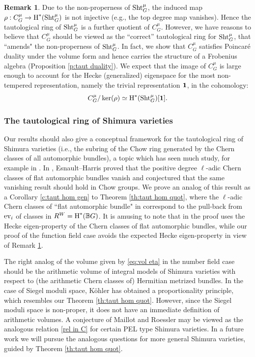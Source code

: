 \documentclass[reqno]{amsart}
\numberwithin{equation}{subsection}
\theoremstyle{definition}
\newtheorem{remark}[subsubsection]{Remark}
\def\BB{\mathbb{B}}
\newcommand\ev{\textup{ev}}
\newcommand\Sht{\textup{Sht}}
\newcommand{\cohog}[2]{\textup{H}^{#1}({#2})}     %
\begin{document}
\begin{remark}\label{rem hk=1}
Due to the non-properness of $\Sht^\mu_G$, the induced map $\rho:C^\mu_G  \to \cohog{*}{\Sht^\mu_G}$  is not injective (e.g., the top degree map vanishes). Hence the tautological ring of $\Sht^\mu_G$ is a further quotient of $C^\mu_G$. However, we have reasons to believe that $C^\mu_G$ should be viewed as the ``correct'' tautological ring for $\Sht^\mu_G$, that ``amends" the non-properness of $\Sht^\mu_G$. In fact, we show that $C^\mu_G$ satisfies Poincar\'e duality under the volume form and hence carries the structure of a Frobenius algebra (Proposition \ref{p:taut duality}).
We expect that the image of $C^\mu_G$ is large enough to account for the Hecke (generalized) eigenspace for the most non-tempered representation, namely the trivial representation ${\bf 1}$, in the cohomology:
$$
C^\mu_G /\ker(\rho) \simeq \cohog{*}{\Sht^\mu_G}[{\bf 1}].
$$
\end{remark}

\subsubsection{The tautological ring of Shimura varieties} Our results should also give a conceptual framework for the tautological ring of Shimura varieties (i.e., the subring of the Chow ring generated by the Chern classes of all automorphic bundles), a topic which has seen much study, for example in \cite{vdG,EH,WZ}. In \cite{EH}, Esnault--Harris proved that the positive degree $\ell$-adic Chern classes of flat automorphic bundles  vanish and conjectured that the same vanishing result should hold in Chow groups. We prove an analog of this result as a Corollary \ref{c:taut hom gen} to  Theorem \ref{th:taut hom quot}, where the $\ell$-adic Chern classes of ``flat automorphic bundle" in \cite{EH} correspond to the pull-back from $\ev_i$ of classes in $R^W=\cohog{*}{\BB G}$. It is amusing to note that in \cite{EH} the proof uses the Hecke eigen-property of the Chern classes of flat automorphic bundles, while our proof of the function field case avoids the expected Hecke eigen-property in view of Remark \ref{rem hk=1}.

The right analog of the volume given by \eqref{eq:vol eta} in the number field case should be the arithmetic volume
of integral models of Shimura varieties with respect to (the arithmetic Chern classes of) Hermitian metrized bundles. In the case of Siegel moduli space, K\"ohler \cite{Koh} has obtained a proportionality principle, which resembles our Theorem \ref{th:taut hom quot}. However, since the Siegel moduli space is non-proper, it does not have an immediate definition of arithmetic volumes. A conjecture of Maillot and Roessler \cite{MR}
may be viewed as the analogous relation \eqref{rel in C} for certain PEL type Shimura varieties.
In a future work we will pursue the analogous questions for more general Shimura varieties, guided by Theorem \ref{th:taut hom quot}. 
\end{document}
